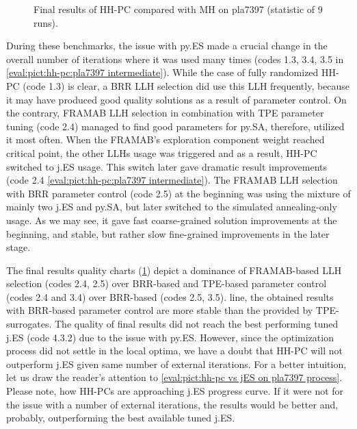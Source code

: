 \begin{figure}[b]
	\centering
	\vspace{-20pt}
	
	\caption{Final results of HH-PC compared with MH on pla7397 (statistic of 9 runs).}
	\vspace{-5pt}
	\label{eval:pict:hh-pc:pla7397 final}
\end{figure}

During these benchmarks, the issue with py.ES made a crucial change in the overall number of iterations where it was used many times (codes 1.3, 3.4, 3.5 in \cref{eval:pict:hh-pc:pla7397 intermediate}). While the case of fully randomized HH-PC (code 1.3) is clear, a BRR LLH selection did use this LLH frequently, because it may have produced good quality solutions as a result of parameter control. On the contrary, FRAMAB LLH selection in combination with TPE parameter tuning (code 2.4) managed to find good parameters for py.SA, therefore, utilized it most often. When the FRAMAB's exploration component weight reached critical point, the other LLHs usage was triggered and as a result, HH-PC switched to j.ES usage. This switch later gave dramatic result improvements (code 2.4 \cref{eval:pict:hh-pc:pla7397 intermediate}). The FRAMAB LLH selection with BRR parameter control (code 2.5) at the beginning was using the mixture of mainly two j.ES and py.SA, but later switched to the simulated annealing-only usage. As we may see, it gave fast coarse-grained solution improvements at the beginning, and stable, but rather slow fine-grained improvements in the later stage.

The final results quality charts (\cref{eval:pict:hh-pc:pla7397 final}) depict a dominance of FRAMAB-based LLH selection (codes 2.4, 2.5) over BRR-based and TPE-based parameter control (codes 2.4 and 3.4) over BRR-based (codes 2.5, 3.5). line, the obtained results with BRR-based parameter control are more stable than the provided by TPE-surrogates. The quality of final results did not reach the best performing tuned j.ES (code 4.3.2) due to the issue with py.ES. However, since the optimization process did not settle in the local optima, we have a doubt that HH-PC will not outperform j.ES given same number of external iterations. For a better intuition, let us draw the reader's attention to \cref{eval:pict:hh-pc vs jES on pla7397 process}. Please note, how HH-PCs are approaching j.ES progress curve. If it were not for the issue with a number of external iterations, the results would be better and, probably, outperforming the best available tuned j.ES.

